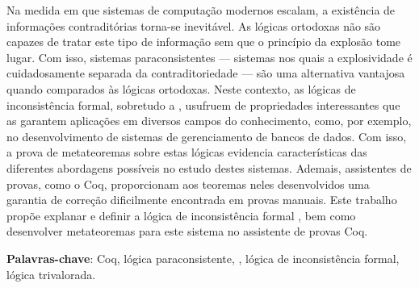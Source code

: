 
\setlength{\absparsep}{18pt} %
\begin{resumo}
    Na medida em que sistemas de computação modernos escalam, a existência de informações contraditórias torna-se inevitável. As lógicas ortodoxas não são capazes de tratar este tipo de informação sem que o princípio da explosão tome lugar. Com isso, sistemas paraconsistentes {---} sistemas nos quais a explosividade é cuidadosamente separada da contraditoriedade {---} são uma alternativa vantajosa quando comparados às lógicas ortodoxas. Neste contexto, as lógicas de inconsistência formal, sobretudo a \lfium{}, usufruem de propriedades interessantes que as garantem aplicações em diversos campos do conhecimento, como, por exemplo, no desenvolvimento de sistemas de gerenciamento de bancos de dados. Com isso, a prova de metateoremas sobre estas lógicas evidencia características das diferentes abordagens possíveis no estudo destes sistemas. Ademais, assistentes de provas, como o Coq, proporcionam aos teoremas neles desenvolvidos uma garantia de correção dificilmente encontrada em provas manuais. Este trabalho propõe explanar e definir a lógica de inconsistência formal \lfium{}, bem como desenvolver metateoremas para este sistema no assistente de provas Coq.

 \textbf{Palavras-chave}: Coq, lógica paraconsistente, \lfium{}, lógica de inconsistência formal, lógica trivalorada.
\end{resumo}
